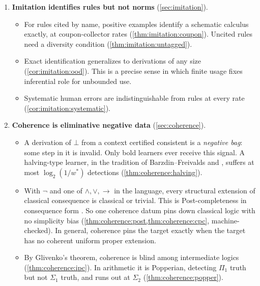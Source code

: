 \begin{enumerate}[label=\textbf{(\arabic*)}]
\begin{itemize}
  \item A Bayesian version is time-uniformly sound via Ville's inequality, using the prior--posterior-ratio martingale of \citet{waudbysmith2020confidence} (\cref{thm:caution:ville}).
  \item This is reliable or KWIK-style learning \citep{rivest1988learning,li2008knows} applied to step checkers; what is specific here is the escalation dimension and its values for rule schemas.
  \end{itemize}
\item \textbf{Imitation identifies rules but not norms} (\cref{sec:imitation}).
  \begin{itemize}
  \item For rules cited by name, positive examples identify a schematic calculus exactly, at coupon-collector rates (\cref{thm:imitation:coupon}). Uncited rules need a diversity condition (\cref{thm:imitation:untagged}).
  \item Exact identification generalizes to derivations of any size (\cref{cor:imitation:ood}). This is a precise sense in which finite usage fixes inferential role for unbounded use.
  \item Systematic human errors are indistinguishable from rules at every rate (\cref{cor:imitation:systematic}).
  \end{itemize}
\item \textbf{Coherence is eliminative negative data} (\cref{sec:coherence}).
  \begin{itemize}
  \item A derivation of $\bot$ from a context certified consistent is a \emph{negative bag}: some step in it is invalid. Only bold learners ever receive this signal. A halving-type learner, in the tradition of Barzdin--Freivalds and \citet{littlestone1988learning}, suffers at most $\log_2(1/w^*)$ detections (\cref{thm:coherence:halving}).
  \item With $\neg$ and one of $\wedge,\vee,\to$ in the language, every structural extension of classical consequence is classical or trivial. This is Post-completeness in consequence form \citep{post1921}. So one coherence datum pins down classical logic with no simplicity bias (\cref{thm:coherence:post,thm:coherence:cpc}, machine-checked). In general, coherence pins the target exactly when the target has no coherent uniform proper extension.
  \item By Glivenko's theorem, coherence is blind among intermediate logics (\cref{thm:coherence:ipc}). In arithmetic it is Popperian, detecting $\Pi_1$ truth but not $\Sigma_1$ truth, and runs out at $\Sigma_2$ (\cref{thm:coherence:popper}).

\end{itemize}
\end{enumerate}
